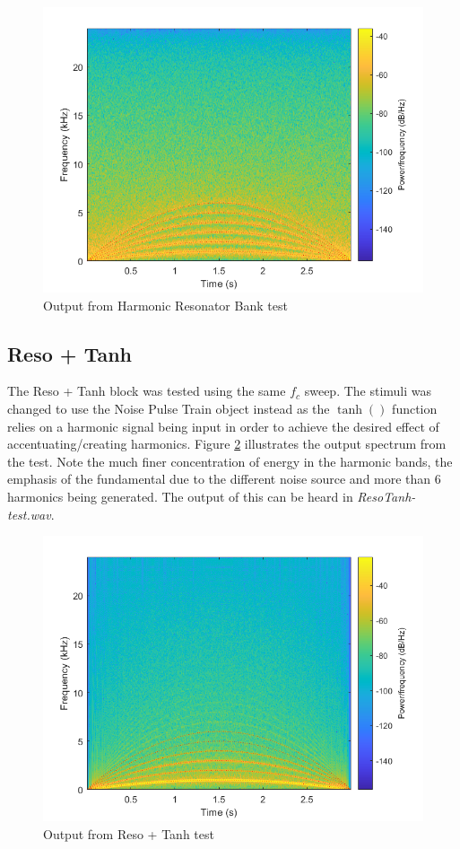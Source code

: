 \documentclass[../main.tex]{subfiles}
\begin{document}
\begin{figure}[h]
    \centering
    \includegraphics[scale=.65]{./images/plots/HRBTest.png}
    \caption{Output from Harmonic Resonator Bank test}
    \label{fig:HRBTest}
\end{figure}

\subsection{Reso + Tanh}
The Reso + Tanh block was tested using the same $f_c$ sweep. The stimuli was changed to use the Noise Pulse Train object instead as the $\tanh()$ function relies on a harmonic signal being input in order to achieve the desired effect of accentuating/creating harmonics. Figure \ref{fig:ResoTanhTest} illustrates the output spectrum from the test. Note the much finer concentration of energy in the harmonic bands, the emphasis of the fundamental due to the different noise source and more than 6 harmonics being generated. The output of this can be heard in \emph{ResoTanh-test.wav}.

\begin{figure}[h]
    \centering
    \includegraphics[scale=.65]{./images/plots/ResoTanhTest.png}
    \caption{Output from Reso + Tanh test}
    \label{fig:ResoTanhTest}
\end{figure}
\end{document}
